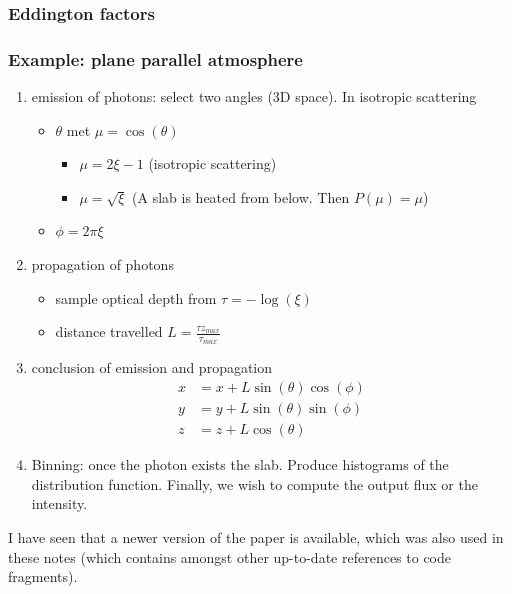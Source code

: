 \documentclass[../main/main.tex]{subfiles}
\begin{document}
\subsubsection{Eddington factors}

\subsubsection{Example: plane parallel atmosphere}
\begin{enumerate}

\item emission of photons: select two angles (3D space). In isotropic scattering
\begin{itemize}
\item $\theta$ met $\mu = \cos(\theta)$
	\begin{itemize}
	\item $\mu = 2\xi -1$ (isotropic scattering)
	\item $\mu = \sqrt{\xi}$ (A slab is heated from below. Then $P(\mu) = \mu$)
	\end{itemize}
\item $\phi = 2 \pi \xi$
\end{itemize}

\item propagation of photons
\begin{itemize}
\item sample optical depth from $\tau = -\log(\xi)$
\item distance travelled $L = \frac{\tau z_{max}}{\tau_{max}}$
\end{itemize}

\item conclusion of emission and propagation
\begin{equation}
\begin{aligned}
x &= x + L \sin(\theta) \cos(\phi) \\
y &= y + L \sin(\theta) \sin(\phi) \\
z &= z + L \cos(\theta)
\end{aligned}
\end{equation}

\item Binning: once the photon exists the slab. Produce histograms of the distribution function. Finally, we wish to compute the output flux or the intensity.
\end{enumerate}

I have seen that a newer version of the paper is available, which was also used in these notes (which contains amongst other up-to-date references to code fragments).
\end{document}
